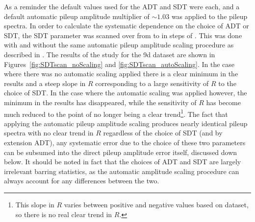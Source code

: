 As a reminder the default values used for the ADT and SDT were  each, and a default automatic pileup amplitude multiplier of $\sim1.03$ was applied to the pileup spectra. In order to calculate the systematic dependence on the choice of ADT or SDT, the SDT parameter was scanned over from  to  in steps of . This was done with and without the same automatic pileup amplitude scaling procedure as described in . The results of the study for the 9d dataset are shown in Figures~\ref{fig:SDTscan_noScaling} and \ref{fig:SDTscan_autoScaling}. In the case where there was no automatic scaling applied there is a clear minimum in the \chisq results and a steep slope in $R$ corresponding to a large sensitivity of $R$ to the choice of SDT. In the case where the automatic scaling was applied however, the minimum in the \chisq results has disappeared, while the sensitivity of $R$ has become much reduced to the point of no longer being a clear trend\footnote{This slope in $R$ varies between positive and negative values based on dataset, so there is no real clear trend in $R$.}. The fact that applying the automatic pileup amplitude scaling produces nearly identical pileup spectra with no clear trend in $R$ regardless of the choice of SDT (and by extension ADT), any systematic error due to the choice of these two parameters can be subsumed into the direct pileup amplitude error itself, discussed down below. It should be noted in fact that the choices of ADT and SDT are largely irrelevant barring statistics, as the automatic amplitude scaling procedure can always account for any differences between the two. 


